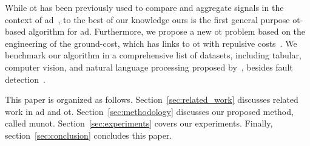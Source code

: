 While \gls{ot} has been previously used to compare and aggregate signals in the context of \gls{ad}~\citep{alaoui2019unsupervised,alaoui2020semi}, to the best of our knowledge ours is the first general purpose \gls{ot}-based algorithm for \gls{ad}. Furthermore, we propose a new \gls{ot} problem based on the engineering of the ground-cost, which has links to \gls{ot} with repulsive costs~\citep{di2017optimal}. We benchmark our algorithm in a comprehensive list of datasets, including tabular, computer vision, and natural language processing proposed by~\cite{han2022adbench}, besides fault detection~\citep{reinartz2021extended,montesuma2024benchmarking}.


This paper is organized as follows. Section~\ref{sec:related_work} discusses related work in \gls{ad} and \gls{ot}. Section~\ref{sec:methodology} discusses our proposed method, called \gls{munot}. Section~\ref{sec:experiments} covers our experiments. Finally, section~\ref{sec:conclusion} concludes this paper.